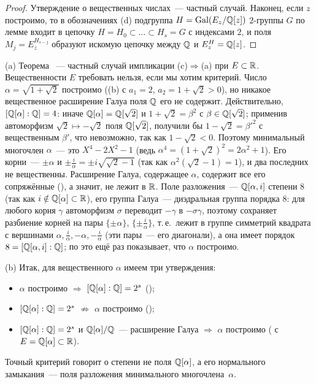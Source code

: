 \begin{proof}
Утверждение о вещественных числах~--- частный случай. Наконец, если $z$ построимо, то в обозначениях (d) подгруппа
$H=\operatorname{Gal}(E_z/\mathbb Q[z])$ $2$-группы $G$ по лемме  входит в цепочку $H=H_0\subset\dots\subset H_s=G$ с индексами $2$, и
поля $M_j=E_z^{H_{s-j}}$ образуют искомую цепочку между $\mathbb Q$ и $E_z^H=\mathbb Q[z]$.
\end{proof}

\begin{remark}[3.25c]
(a) Теорема ~--- частный случай импликации (c)$\Rightarrow$(a) при $E\subset\mathbb R$. Вещественности $E$ требовать
нельзя, если мы хотим критерий. Число $\alpha=\sqrt{1+\sqrt2}$ построимо ((b) с $a_1=2$, $a_2=1+\sqrt2>0$), но
никакое вещественное расширение Галуа поля $\mathbb Q$ его не содержит. Действительно, $[\mathbb Q[\alpha]:\mathbb Q]=4$: иначе
$\mathbb Q[\alpha]=\mathbb Q[\sqrt2]$ и $1+\sqrt2=\beta^2$ с $\beta\in\mathbb Q[\sqrt2]$; применив автоморфизм $\sqrt2\mapsto-\sqrt2$ поля
$\mathbb Q[\sqrt2]$, получили бы $1-\sqrt2=\beta'^2$ с вещественным $\beta'$, что невозможно, так как $1-\sqrt2<0$. Поэтому
минимальный многочлен $\alpha$~--- это $X^4-2X^2-1$ (ведь $\alpha^4=(1+\sqrt2)^2=2\alpha^2+1$). Его корни~--- $\pm\alpha$ и
$\pm\frac i\alpha=\pm i\sqrt{\sqrt2-1}$ (так как $\alpha^2(\sqrt2-1)=1$), и два последних не вещественны. Расширение Галуа,
содержащее $\alpha$, содержит все его сопряжённые (), а значит, не лежит в $\mathbb R$. Поле разложения~---
$\mathbb Q[\alpha,i]$ степени $8$ (так как $i\notin\mathbb Q[\alpha]\subset\mathbb R$), его группа Галуа~--- диэдральная группа порядка $8$: для
любого корня $\gamma$ автоморфизм $\sigma$ переводит $-\gamma$ в $-\sigma\gamma$, поэтому сохраняет разбиение корней на пары
$\{\pm\alpha\}$, $\{\pm\frac i\alpha\}$, т.\,е.\ лежит в группе симметрий квадрата с вершинами $\alpha,\frac i\alpha,-\alpha,-\frac i\alpha$
(эти пары~--- его диагонали), а она имеет порядок $8=[\mathbb Q[\alpha,i]:\mathbb Q]$; по
 это ещё раз показывает, что $\alpha$ построимо.

(b) Итак, для вещественного $\alpha$ имеем три утверждения:
\begin{itemize}
\item $\alpha$ построимо $\Rightarrow$ $[\mathbb Q[\alpha]:\mathbb Q]=2^s$ ();
\item $[\mathbb Q[\alpha]:\mathbb Q]=2^s$ $\not\Rightarrow$ $\alpha$ построимо ();
\item $[\mathbb Q[\alpha]:\mathbb Q]=2^s$ и $\mathbb Q[\alpha]/\mathbb Q$~--- расширение Галуа $\Rightarrow$ $\alpha$ построимо ( с $E=\mathbb Q[\alpha]\subset\mathbb R$).
\end{itemize}
Точный критерий  говорит о степени не поля $\mathbb Q[\alpha]$, а его нормального замыкания~--- поля разложения
минимального многочлена~$\alpha$.
\end{remark}

